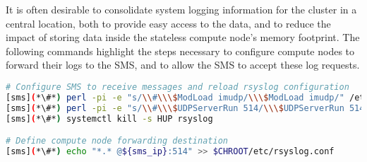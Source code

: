 It is often desirable to consolidate system logging information for the cluster in a
central location, both to provide easy access to the data, and to reduce the
impact of storing data inside the stateless compute node's memory footprint. The
following commands highlight the steps necessary to configure compute nodes to
forward their logs to the SMS, and to allow the SMS to accept these log requests.


\begin{lstlisting}[language=bash,keywords={}]
# Configure SMS to receive messages and reload rsyslog configuration
[sms](*\#*) perl -pi -e "s/\\#\\\$ModLoad imudp/\\\$ModLoad imudp/" /etc/rsyslog.conf
[sms](*\#*) perl -pi -e "s/\\#\\\$UDPServerRun 514/\\\$UDPServerRun 514/" /etc/rsyslog.conf
[sms](*\#*) systemctl kill -s HUP rsyslog

# Define compute node forwarding destination
[sms](*\#*) echo "*.* @${sms_ip}:514" >> $CHROOT/etc/rsyslog.conf
\end{lstlisting}
